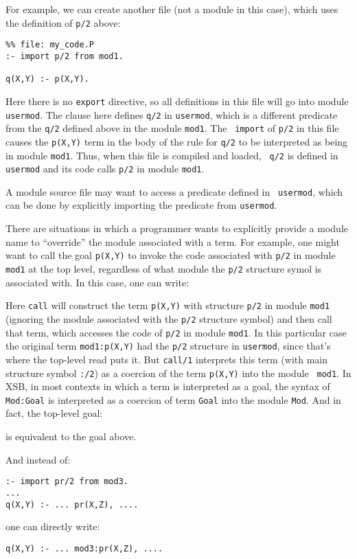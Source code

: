 For example, we can create another file (not a module in this case),
which uses the definition of {\tt p/2} above:
\begin{verbatim}
%% file: my_code.P
:- import p/2 from mod1.

q(X,Y) :- p(X,Y).
\end{verbatim}
\noindent Here there is no {\tt export} directive, so all definitions
in this file will go into module {\tt usermod}.  The clause here
defines {\tt q/2} in {\tt usermod}, which is a different predicate
from the {\tt q/2} defined above in the module {\tt mod1}.  The {\tt
  import} of {\tt p/2} in this file causes the {\tt p(X,Y)} term in
the body of the rule for {\tt q/2} to be interpreted as being in
module {\tt mod1}.  Thus, when this file is compiled and loaded, {\tt
  q/2} is defined in {\tt usermod} and its code calls {\tt p/2} in
module {\tt mod1}.

A module source file may want to access a predicate defined in {\tt
  usermod}, which can be done by explicitly importing the predicate
from {\tt usermod}.

There are situations in which a programmer wants to explicitly provide
a module name to ``override'' the module associated with a term.  For
example, one might want to call the goal {\tt p(X,Y)} to invoke the
code associated with {\tt p/2} in module {\tt mod1} at the top level,
regardless of what module the {\tt p/2} structure symol is associated
with.  In this case, one can write:


\noindent Here {\tt call} will construct the term {\tt p(X,Y)} with
structure {\tt p/2} in module {\tt mod1} (ignoring the module associated
with the {\tt p/2} structure symbol) and then call that term, which
accesses the code of {\tt p/2} in module {\tt mod1}.  In this
particular case the original term {\tt mod1:p(X,Y)} had the {\tt p/2}
structure in {\tt usermod}, since that's where the top-level read puts
it.  But {\tt call/1} interprets this term (with main structure symbol
{\tt :/2}) as a coercion of the term {\tt p(X,Y)} into the module {\tt
  mod1}.  In XSB, in most contexts in which a term is interpreted as a
goal, the syntax of {\tt Mod:Goal} is interpreted as a coercion of
term {\tt Goal} into the module {\tt Mod}.  And in fact, the top-level
goal:


\noindent is equivalent to the goal above.

And instead of:
\begin{verbatim}
:- import pr/2 from mod3.
...
q(X,Y) :- ... pr(X,Z), ....
\end{verbatim}
one can directly write:
\begin{verbatim}
q(X,Y) :- ... mod3:pr(X,Z), ....
\end{verbatim}

